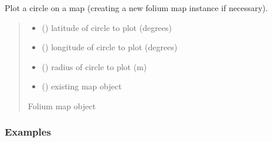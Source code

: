 \documentclass[letterpaper,10pt,english]{sphinxmanual}
\begin{document}
\begin{fulllineitems}
\label{\detokenize{index:mapping.plot_circle}}
\pysigstartsignatures
{}
\pysigstopsignatures
\sphinxAtStartPar
Plot a circle on a map (creating a new folium map instance if necessary).
\begin{quote}\begin{description}
\begin{itemize}
\item {} 
\sphinxAtStartPar
{} () \textendash{} latitude of circle to plot (degrees)

\item {} 
\sphinxAtStartPar
{} () \textendash{} longitude of circle to plot (degrees)

\item {} 
\sphinxAtStartPar
{} () \textendash{} radius of circle to plot (m)

\item {} 
\sphinxAtStartPar
{} () \textendash{} existing map object

\end{itemize}

\sphinxAtStartPar
Folium map object

\end{description}\end{quote}
\subsubsection*{Examples}

\begin{sphinxVerbatim}[commandchars=\\\{\}]
 
   
\end{sphinxVerbatim}

\end{fulllineitems}
\end{document}
